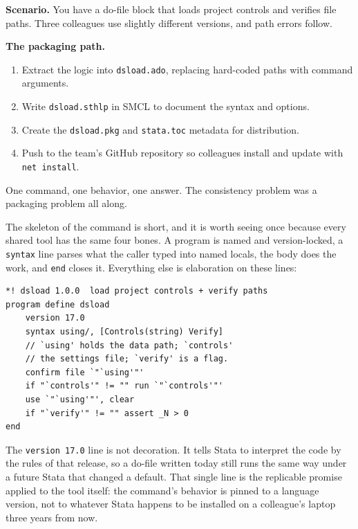 \documentclass[
    a4paper,
    fontsize=10pt,
    twoside=true,
    numbers=noenddot,
]{kaobook}
\newcounter{appliedexample}
\newenvironment{appliedexample}[1][]{%
    \refstepcounter{appliedexample}%
    \begin{appliedexamplebox}[frametitle={Applied Example~\theappliedexample.~~#1}]%
}{%
    \end{appliedexamplebox}%
}
\begin{document}
\begin{appliedexample}[Turning a one-off script into a shared tool]
\textbf{Scenario.} You have a do-file block that loads project controls and verifies file paths. Three colleagues use slightly different versions, and path errors follow.

\medskip
\textbf{The packaging path.}
\begin{enumerate}
    \item Extract the logic into \texttt{dsload.ado}, replacing hard-coded paths with command arguments.
    \item Write \texttt{dsload.sthlp} in SMCL to document the syntax and options.
    \item Create the \texttt{dsload.pkg} and \texttt{stata.toc} metadata for distribution.
    \item Push to the team's GitHub repository so colleagues install and update with \texttt{net install}.
\end{enumerate}
One command, one behavior, one answer. The consistency problem was a packaging problem all along.
\end{appliedexample}

The skeleton of the command is short, and it is worth seeing once because every shared tool has the same four bones. A program is named and version-locked, a \texttt{syntax} line parses what the caller typed into named locals, the body does the work, and \texttt{end} closes it. Everything else is elaboration on these lines:
{\footnotesize
\begin{verbatim}
*! dsload 1.0.0  load project controls + verify paths
program define dsload
    version 17.0
    syntax using/, [Controls(string) Verify]
    // `using' holds the data path; `controls'
    // the settings file; `verify' is a flag.
    confirm file `"`using'"'
    if "`controls'" != "" run `"`controls'"'
    use `"`using'"', clear
    if "`verify'" != "" assert _N > 0
end
\end{verbatim}
}
The \texttt{version 17.0} line is not decoration. It tells Stata to interpret the code by the rules of that release, so a do-file written today still runs the same way under a future Stata that changed a default. That single line is the replicable promise applied to the tool itself: the command's behavior is pinned to a language version, not to whatever Stata happens to be installed on a colleague's laptop three years from now.
\end{document}
